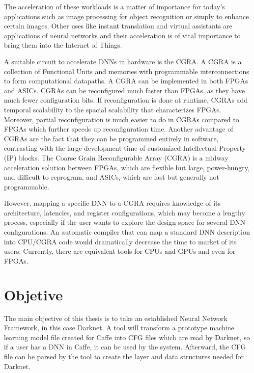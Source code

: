 The acceleration of these workloads is a matter of importance for today's
applications such as image processing for object recognition or simply to
enhance certain images. Other uses like instant translation and virtual
assistants are applications of neural networks and their acceleration is of
vital importance to bring them into the Internet of Things.

A suitable circuit to accelerate DNNs in hardware is the CGRA. A CGRA is a
collection of Functional Units and memories with programmable interconnections
to form computational datapaths. A CGRA can be implemented in both
FPGAs and ASICs. CGRAs can be reconfigured much faster than FPGAs, as they have
much fewer configuration bits. If reconfiguration is done at runtime, CGRAs add
temporal scalability to the spacial scalability that characterizes
FPGAs. Moreover, partial reconfiguration is much easier to do in CGRAs compared
to FPGAs which further speeds up reconfiguration time. Another advantage of
CGRAs are the fact that they can be programmed entirely in software, contrasting
with the large development time of customized Intellectual Property (IP) blocks.
The Coarse Grain Reconfigurable Array (CGRA) is a midway acceleration solution
between FPGAs, which are flexible but large, power-hungry, and difficult to
reprogram, and ASICs, which are fast but generally not programmable.

However, mapping a specific DNN to a CGRA requires knowledge of its
architecture, latencies, and register configurations, which may become a lengthy
process, especially if the user wants to explore the design space for several
DNN configurations. An automatic compiler that can map a standard DNN
description into CPU/CGRA code would dramatically decrease the time to market of its
users. Currently, there are equivalent tools for CPUs and GPUs and
even for FPGAs.


\section{Objetive}
\label{section:objetctive}

The main objective of this thesis is to take an established Neural Network Framework, in this case
Darknet\cite{Darknet}. A tool will transform a prototype machine learning model file created for Caffe into CFG files
which are read by Darknet, so if a user has a DNN in Caffe, it can be used by the system.
Afterward, the CFG file can be parsed by the tool to create the layer and data structures
needed for Darknet.

